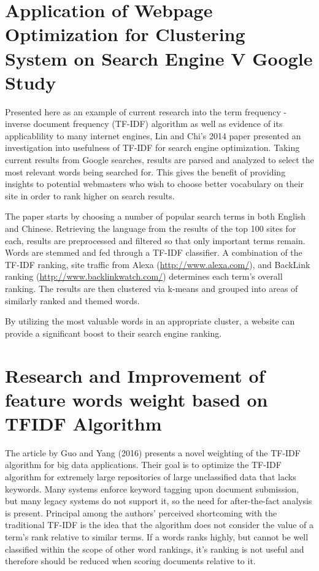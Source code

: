 \documentclass{article}
\begin{document}
\section{Application of Webpage Optimization for Clustering System on Search Engine V Google Study}

Presented here as an example of current research into the term frequency - inverse document frequency (TF-IDF) algorithm as well as evidence of its applicablility to many internet engines, Lin and Chi's 2014 paper \cite{6845978} presented an investigation into usefulness of TF-IDF for search engine optimization. Taking current results from Google searches, results are parsed and analyzed to select the most relevant words being searched for. This gives the benefit of providing insights to potential webmasters who wish to choose better vocabulary on their site in order to rank higher on search results. 

The paper starts by choosing a number of popular search terms in both English and Chinese. Retrieving the language from the results of the top 100 sites for each, results are preprocessed and filtered so that only important terms remain. Words are stemmed and fed through a TF-IDF classifier. A combination of the TF-IDF ranking, site traffic from Alexa (\url{http://www.alexa.com/}), and BackLink ranking (\url{http://www.backlinkwatch.com/}) determines each term's overall ranking. The results are then clustered via k-means and grouped into areas of similarly ranked and themed words.

By utilizing the most valuable words in an appropriate cluster, a website can provide a significant boost to their search engine ranking.

\section{Research and Improvement of feature words weight
based on TFIDF Algorithm}

The article by Guo and Yang (2016) \cite{7560393} presents a novel weighting of the TF-IDF algorithm for big data applications. Their goal is to optimize the TF-IDF algorithm for extremely large repositories of large unclassified data that lacks keywords. Many systems enforce keyword tagging upon document submission, but many legacy systems do not support it, so the need for after-the-fact analysis is present. Principal among the authors' perceived shortcoming with the traditional TF-IDF is the idea that the algorithm does not consider the value of a term's rank relative to similar terms. If a words ranks highly, but cannot be well classified within the scope of other word rankings, it's ranking is not useful and therefore should be reduced when scoring documents relative to it.
\end{document}
